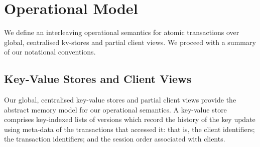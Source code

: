 \section{Operational Model}
\label{sec:model}

We define an interleaving operational semantics for atomic transactions over
global, centralised kv-stores and partial client views. 
We proceed with a summary of our notational conventions.



\subsection{Key-Value Stores and Client Views}
\label{subsec:kvstores}
\label{sec:mkvs-view}
Our global, centralised key-value stores and partial client views
provide the abstract memory model for our operational semantics. A
key-value store comprises key-indexed lists of versions which record
the history of the key update using meta-data of the
transactions that accessed it: that is,  the client identifiers;
the transaction identifiers; and the session order associated with
clients. 





